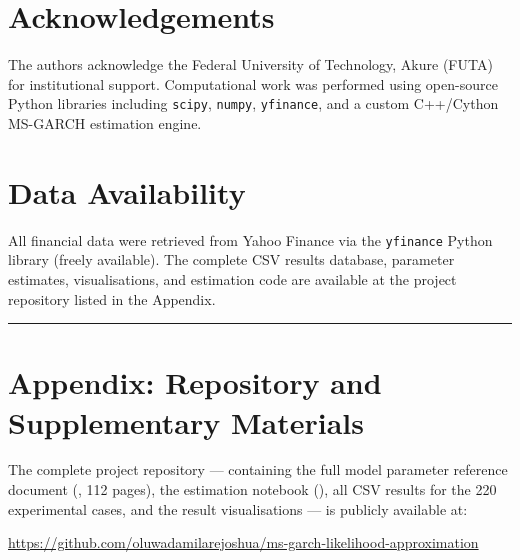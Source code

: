 \documentclass[12pt, a4paper]{article}
\begin{document}
\section*{Acknowledgements}

The authors acknowledge the Federal University of Technology, Akure (FUTA) for institutional support. Computational work was performed using open-source Python libraries including \texttt{scipy}, \texttt{numpy}, \texttt{yfinance}, and a custom C++/Cython MS-GARCH estimation engine.

\section*{Data Availability}

All financial data were retrieved from Yahoo Finance via the \texttt{yfinance} Python library (freely available). The complete CSV results database, parameter estimates, visualisations, and estimation code are available at the project repository listed in the Appendix.



\bigskip
\noindent\rule{\linewidth}{0.4pt}
\bigskip

\section*{Appendix: Repository and Supplementary Materials}

The complete project repository — containing the full model parameter reference document (, 112 pages), the estimation notebook (), all CSV results for the 220 experimental cases, and the result visualisations — is publicly available at:

\medskip
{\small\noindent\url{https://github.com/oluwadamilarejoshua/ms-garch-likelihood-approximation}}
\end{document}
